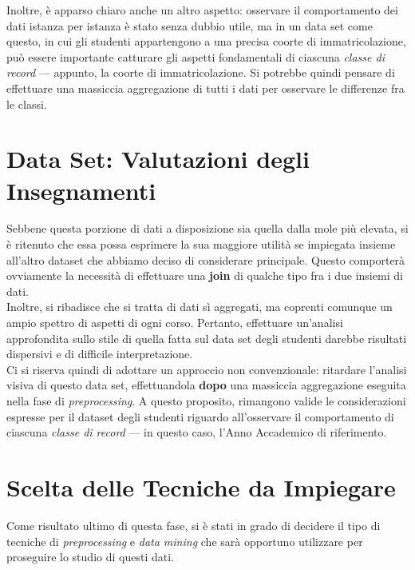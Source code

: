             Inoltre, è apparso chiaro anche un altro aspetto: osservare il comportamento dei dati istanza per istanza è stato senza dubbio utile, ma in un data set come questo, in cui gli studenti appartengono a una precisa coorte di immatricolazione, può essere importante catturare gli aspetti fondamentali di ciascuna \textit{classe di record} --- appunto, la coorte di immatricolazione. Si potrebbe quindi pensare di effettuare una massiccia aggregazione di tutti i dati per osservare le differenze fra le classi.

    \section{Data Set: Valutazioni degli Insegnamenti}

        Sebbene questa porzione di dati a disposizione sia quella dalla mole più elevata, si è ritenuto che essa possa esprimere la sua maggiore utilità se impiegata insieme all'altro dataset che abbiamo deciso di considerare principale. Questo comporterà ovviamente la necessità di effettuare una \textbf{join} di qualche tipo fra i due insiemi di dati.\\

        Inoltre, si ribadisce che si tratta di dati sì aggregati, ma coprenti comunque un ampio spettro di aspetti di ogni corso. Pertanto, effettuare un'analisi approfondita sullo stile di quella fatta sul data set degli studenti darebbe risultati dispersivi e di difficile interpretazione. \\

        Ci si riserva quindi di adottare un approccio non convenzionale: ritardare l'analisi visiva di questo data set, effettuandola \textbf{dopo} una massiccia aggregazione eseguita nella fase di \textit{preprocessing}. A questo proposito, rimangono valide le considerazioni espresse per il dataset degli studenti riguardo all'osservare il comportamento di ciascuna \textit{classe di record} --- in questo caso, l'Anno Accademico di riferimento.

    \section{Scelta delle Tecniche da Impiegare}

        Come risultato ultimo di questa fase, si è stati in grado di decidere il tipo di tecniche di \textit{preprocessing} e \textit{data mining} che sarà opportuno utilizzare per proseguire lo studio di questi dati. \\

